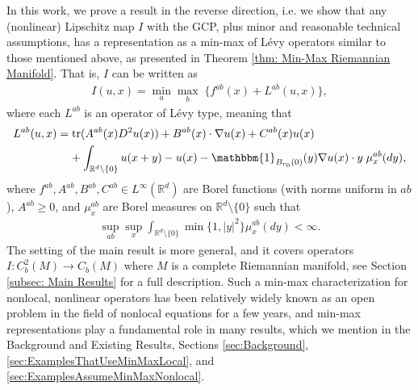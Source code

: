 \documentclass[11pt,reqno]{amsart}
\numberwithin{equation}{section}
\theoremstyle{plain}
\def\Indicator{{\mathbbm{1}}}
\def\Tr{\textnormal{tr}}
\begin{document}
In this work, we prove a result in the reverse direction, i.e. we show that any (nonlinear) Lipschitz map $I$ with the GCP, plus minor and reasonable technical assumptions, has a representation as a min-max of L\'evy operators similar to those mentioned above, as presented in Theorem \ref{thm: Min-Max Riemannian Manifold}.  That is, $I$ can be written as
\begin{align}\label{eqn:intro min-max formula}
  I(u,x) = \min\limits_{a}\max\limits_{b} \;\{ f^{ab}(x) + L^{ab}(u,x)\},
\end{align}
where each $L^{ab}$ is an operator of L\'evy type, meaning that
\begin{align*}
L^{ab}(u,x) & = \Tr(A^{ab}(x)D^2u(x))+B^{ab}(x)\cdot \nabla u(x)+C^{ab}(x)u(x)\nonumber\\
   & \;\;\;\;+ \int_{\mathbb{R}^d\setminus\{0\}}u(x+y)-u(x)-\Indicator_{B_{r_0}(0)}(y)\nabla u(x)\cdot y \;\mu^{ab}_x(dy),	
\end{align*}	
where $f^{ab},A^{ab},B^{ab},C^{ab}\in L^\infty(\mathbb{R}^d)$ are Borel functions (with norms uniform in $ab$), $A^{ab}\geq 0$, and $\mu^{ab}_x$ are Borel measures on $\mathbb{R}^d\setminus\{0\}$ such that
\begin{align*}
  \sup_{ab}\sup\limits_x\int_{\mathbb{R}^d\setminus\{0\}}\min\{1,|y|^2\}\mu^{ab}_x(dy)<\infty.
\end{align*}
The setting of the main result is more general, and it covers operators $I:C^{2}_b(M)\to C_b(M)$ where $M$ is a complete Riemannian manifold, see Section \ref{subsec: Main Results} for a full description.  Such a min-max characterization for nonlocal, nonlinear operators has been relatively widely known as an open problem in the field of nonlocal equations for a few years, and min-max representations play a fundamental role in many results, which we mention in the Background and Existing Results, Sections \ref{sec:Background}, \ref{sec:ExamplesThatUseMinMaxLocal}, and \ref{sec:ExamplesAssumeMinMaxNonlocal}.
\end{document}

